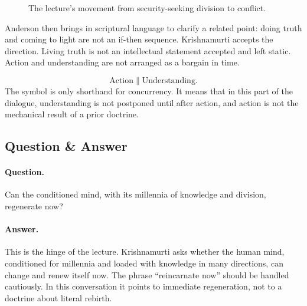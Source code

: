 \begin{figure}
\centering
{}
\caption{The lecture's movement from security-seeking division to conflict.}
\end{figure}

Anderson then brings in scriptural language to clarify a related point: doing truth and coming to light are not an if-then sequence. Krishnamurti accepts the direction. Living truth is not an intellectual statement accepted and left static. Action and understanding are not arranged as a bargain in time.

\begin{equation}
\mathrm{Action}
\parallel
\mathrm{Understanding}.
\end{equation}
The symbol is only shorthand for concurrency. It means that in this part of the dialogue, understanding is not postponed until after action, and action is not the mechanical result of a prior doctrine.

\subsection{Question \& Answer}

\paragraph{Question.}
Can the conditioned mind, with its millennia of knowledge and division, regenerate now?

\paragraph{Answer.}
This is the hinge of the lecture. Krishnamurti asks whether the human mind, conditioned for millennia and loaded with knowledge in many directions, can change and renew itself now. The phrase ``reincarnate now'' should be handled cautiously. In this conversation it points to immediate regeneration, not to a doctrine about literal rebirth.

